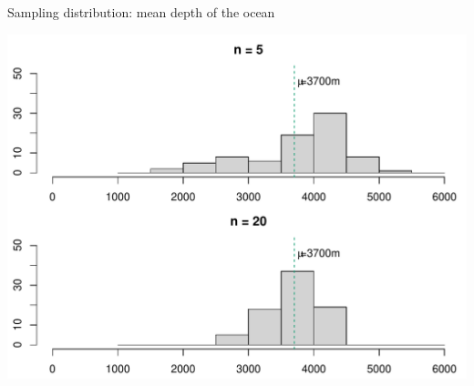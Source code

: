 \documentclass[10pt]{beamer}\usepackage[]{graphicx}\usepackage[]{color}
\makeatletter
\def\maxwidth{ %
  \ifdim\Gin@nat@width>\linewidth
    \linewidth
  \else
    \Gin@nat@width
  \fi
}
\newenvironment{knitrout}{}{} %
\makeatother
\begin{document}
\begin{frame}[fragile]{Sampling distribution: mean depth of the ocean}
	

	
\begin{knitrout}\tiny
{}\color{fgcolor}

{\centering \includegraphics[width=\maxwidth]{figure/unnamed-chunk-9-1} 

}



\end{knitrout}
	
\end{frame}
\end{document}
